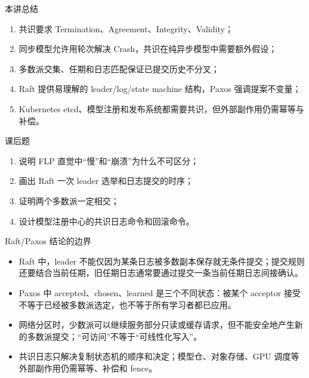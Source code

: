 \documentclass[UTF8,fontset=none,aspectratio=169,10pt]{beamer}
\begin{document}
\begin{frame}{本讲总结}
\begin{enumerate}
  \item 共识要求 Termination、Agreement、Integrity、Validity；
  \item 同步模型允许用轮次解决 Crash，共识在纯异步模型中需要额外假设；
  \item 多数派交集、任期和日志匹配保证已提交历史不分叉；
  \item Raft 提供易理解的 leader/log/state machine 结构，Paxos 强调提案不变量；
  \item Kubernetes etcd、模型注册和发布系统都需要共识，但外部副作用仍需幂等与补偿。
\end{enumerate}
\vfill
{}
\end{frame}

\begin{frame}{课后题}
\begin{enumerate}
  \item 说明 FLP 直觉中“慢”和“崩溃”为什么不可区分；
  \item 画出 Raft 一次 leader 选举和日志提交的时序；
  \item 证明两个多数派一定相交；
  \item 设计模型注册中心的共识日志命令和回滚命令。
\end{enumerate}
\end{frame}

\begin{frame}{Raft/Paxos 结论的边界}
\small
\begin{itemize}
  \item Raft 中，leader 不能仅因为某条日志被多数副本保存就无条件提交；提交规则还要结合当前任期，旧任期日志通常要通过提交一条当前任期日志间接确认。
  \item Paxos 中 accepted、chosen、learned 是三个不同状态：被某个 acceptor 接受不等于已经被多数派选定，也不等于所有学习者都已应用。
  \item 网络分区时，少数派可以继续服务部分只读或缓存请求，但不能安全地产生新的多数派提交；“可访问”不等于“可线性化写入”。
  \item 共识日志只解决复制状态机的顺序和决定；模型仓、对象存储、GPU 调度等外部副作用仍需幂等、补偿和 fence。
\end{itemize}
\vfill
{}
\end{frame}
\end{document}
